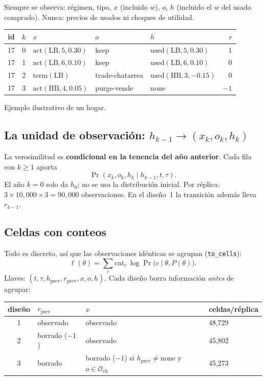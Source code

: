 \documentclass[11pt]{article}
\newcommand{\code}[1]{\texttt{\small #1}}
\newcommand{\act}{\mathrm{act}}
\newcommand{\term}{\mathrm{term}}
\newcommand{\none}{\mathrm{none}}
\newcommand{\used}{\mathrm{used}}
\newcommand{\1}{\mathbf{1}}
\newcommand{\Osc}{\mathcal{O}_{\mathrm{ch}}}
\begin{document}
Siempre se observa: régimen, tipo, $x$ (incluido $w$), $o$, $h$ (incluido el $w$ del usado
comprado). Nunca: precios de usados ni choques de utilidad.

\begin{center}
\begin{tabular}{cclllr}
\toprule
id & $k$ & $x$ & $o$ & $h$ & $r$\\
\midrule
17 & 0 & $\act(\text{LB},5,0.30)$ & keep & $\used(\text{LB},5,0.30)$ & 1\\
17 & 1 & $\act(\text{LB},6,0.10)$ & keep & $\used(\text{LB},6,0.10)$ & 0\\
17 & 2 & $\term(\text{LB})$ & trade-chatarrea & $\used(\text{HB},3,-0.15)$ & 0\\
17 & 3 & $\act(\text{HB},4,0.05)$ & purge-vende & $\none$ & $-1$\\
\bottomrule
\end{tabular}

\smallskip
{\small Ejemplo ilustrativo de un hogar.}
\end{center}

\subsection{La unidad de observación: $h_{k-1}\to(x_k,o_k,h_k)$}

La verosimilitud es \textbf{condicional en la tenencia del año anterior}. Cada fila con
$k\ge 1$ aporta
\[
  \Pr(x_k,o_k,h_k\mid h_{k-1},t,\tau).
\]
El año $k=0$ solo da $h_0$; no se usa la distribución inicial. Por réplica:
$3\times 10{,}000\times 3 = 90{,}000$ observaciones. En el diseño~1 la transición además
lleva $r_{k-1}$.

\subsection{Celdas con conteos}

Todo es discreto, así que las observaciones idénticas se agrupan (\code{to\_cells}):
\[
  \ell(\theta)=\sum_{c}\text{cnt}_c\,\log\Pr\bigl(c\mid\theta,P(\theta)\bigr).
\]
Llaves: $(t,\tau,h_{\text{prev}},r_{\text{prev}},x,o,h)$. Cada diseño borra información
\emph{antes} de agrupar:

\begin{center}
\begin{tabular}{clll}
\toprule
diseño & $r_{\text{prev}}$ & $x$ & celdas/réplica\\
\midrule
1 & observado & observado & 48,729\\
2 & borrado ($-1$) & observado & 45,802\\
3 & borrado & borrado ($-1$) si $h_{\text{prev}}\neq\none$ y $o\in\Osc$ & 45,273\\
\bottomrule
\end{tabular}
\end{center}
\end{document}
